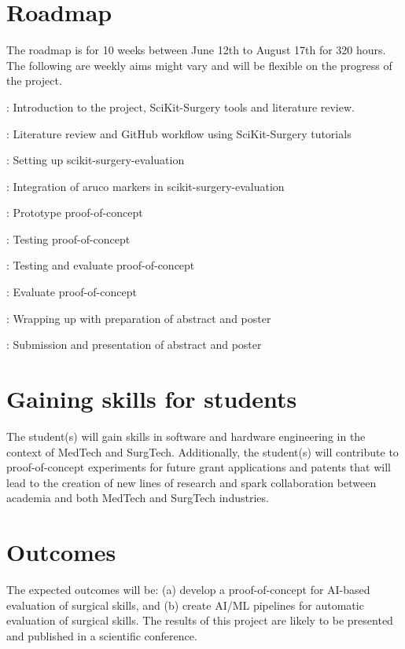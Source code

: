 \documentclass[11pt]{article}
\begin{document}
\section{Roadmap}
The roadmap is for 10 weeks between June 12th to August 17th for 320 hours.
The following are weekly aims might vary and will be flexible on the progress of the project.
\begin{description}[align=left]
\item [Week 01]: Introduction to the project, SciKit-Surgery tools and literature review.
\item [Week 02]: Literature review and GitHub workflow using SciKit-Surgery tutorials
\item [Week 03]: Setting up scikit-surgery-evaluation \cite{Thompson2022}
\item [Week 04]: Integration of aruco markers in scikit-surgery-evaluation
\item [Week 05]: Prototype proof-of-concept
\item [Week 06]: Testing proof-of-concept
\item [Week 07]: Testing and evaluate proof-of-concept
\item [Week 08]: Evaluate proof-of-concept
\item [Week 09]: Wrapping up with preparation of abstract and poster
\item [Week 10]: Submission and presentation of abstract and poster
\end{description}


\section{Gaining skills for students}
The student(s) will gain skills in software and hardware engineering in the context of MedTech and SurgTech.
Additionally, the student(s) will contribute to proof-of-concept experiments for future grant applications and patents that will lead to the creation of new lines of research and spark collaboration between academia and both MedTech and SurgTech industries.

\section{Outcomes}
The expected outcomes will be: 
(a) develop a proof-of-concept for AI-based evaluation of surgical skills, and 
(b) create AI/ML pipelines for automatic evaluation of surgical skills. 
The results of this project are likely to be presented and published in a scientific conference.
\end{document}

